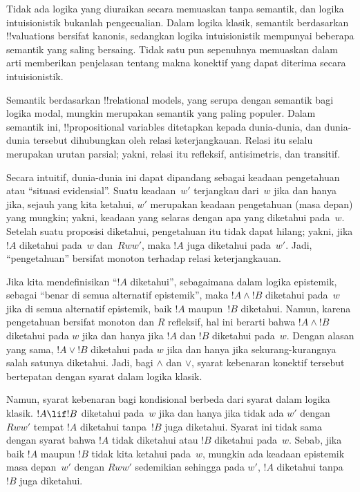 \documentclass[../../../include/open-logic-section]{subfiles}
\begin{document}


Tidak ada logika yang diuraikan secara memuaskan tanpa semantik, dan logika
intuisionistik bukanlah pengecualian. Dalam logika klasik, semantik berdasarkan
!!{valuation}s bersifat kanonis, sedangkan logika intuisionistik mempunyai
beberapa semantik yang saling bersaing. Tidak satu pun sepenuhnya memuaskan
dalam arti memberikan penjelasan tentang makna konektif yang dapat diterima
secara intuisionistik.

Semantik berdasarkan !!{relational model}s, yang serupa dengan semantik bagi
logika modal, mungkin merupakan semantik yang paling populer. Dalam semantik
ini, !!{propositional variable}s ditetapkan kepada dunia-dunia, dan dunia-dunia
tersebut dihubungkan oleh relasi keterjangkauan. Relasi itu selalu merupakan
urutan parsial; yakni, relasi itu refleksif, antisimetris, dan transitif.

Secara intuitif, dunia-dunia ini dapat dipandang sebagai keadaan pengetahuan
atau ``situasi evidensial''. Suatu keadaan~$w'$ terjangkau dari~$w$ jika dan
hanya jika, sejauh yang kita ketahui, $w'$ merupakan keadaan pengetahuan
(masa depan) yang mungkin; yakni, keadaan yang selaras dengan apa yang
diketahui pada~$w$. Setelah suatu proposisi diketahui, pengetahuan itu tidak
dapat hilang; yakni, jika $!A$ diketahui pada~$w$ dan~$Rww'$, maka $!A$ juga
diketahui pada~$w'$. Jadi, ``pengetahuan'' bersifat monoton terhadap relasi
keterjangkauan.

Jika kita mendefinisikan ``$!A$ diketahui'', sebagaimana dalam logika
epistemik, sebagai ``benar di semua alternatif epistemik'', maka $!A \land !B$
diketahui pada~$w$ jika di semua alternatif epistemik, baik $!A$ maupun~$!B$
diketahui. Namun, karena pengetahuan bersifat monoton dan $R$ refleksif, hal
ini berarti bahwa $!A \land !B$ diketahui pada $w$ jika dan hanya jika $!A$
dan $!B$ diketahui pada~$w$. Dengan alasan yang sama, $!A \lor !B$ diketahui
pada $w$ jika dan hanya jika sekurang-kurangnya salah satunya diketahui. Jadi,
bagi $\land$ dan $\lor$, syarat kebenaran konektif tersebut bertepatan dengan
syarat dalam logika klasik.

Namun, syarat kebenaran bagi kondisional berbeda dari syarat dalam logika
klasik. $!A \lif !B$ diketahui pada~$w$ jika dan hanya jika tidak ada $w'$
dengan $Rww'$ tempat $!A$ diketahui tanpa~$!B$ juga diketahui. Syarat ini tidak
sama dengan syarat bahwa $!A$ tidak diketahui atau $!B$ diketahui pada~$w$.
Sebab, jika baik $!A$ maupun $!B$ tidak kita ketahui pada~$w$, mungkin ada
keadaan epistemik masa depan~$w'$ dengan $Rww'$ sedemikian sehingga pada $w'$,
$!A$ diketahui tanpa~$!B$ juga diketahui.
\end{document}
